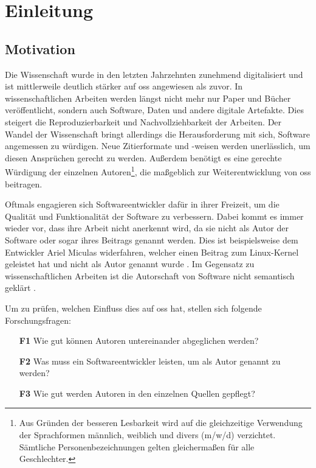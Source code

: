 \chapter{Einleitung}
\label{chap:einleitung}
\section{Motivation}
\label{sec:motivation}
Die Wissenschaft wurde in den letzten Jahrzehnten zunehmend digitalisiert und ist mittlerweile deutlich stärker auf \gls{oss} angewiesen als zuvor.
In wissenschaftlichen Arbeiten werden längst nicht mehr nur Paper und Bücher veröffentlicht, sondern auch Software, Daten und andere digitale Artefakte.
Dies steigert die Reproduzierbarkeit und Nachvollziehbarkeit der Arbeiten.
Der Wandel der Wissenschaft bringt allerdings die Herausforderung mit sich, Software angemessen zu würdigen.
Neue Zitierformate und -weisen werden unerlässlich, um diesen Ansprüchen gerecht zu werden.
Außerdem benötigt es eine gerechte Würdigung der einzelnen Autoren\footnote{Aus Gründen der besseren Lesbarkeit wird auf die gleichzeitige Verwendung der Sprachformen männlich, weiblich und divers (m/w/d) verzichtet. Sämtliche Personenbezeichnungen gelten gleichermaßen für alle Geschlechter.}, die maßgeblich zur Weiterentwicklung von \gls{oss} beitragen.

Oftmals engagieren sich Softwareentwickler dafür in ihrer Freizeit, um die Qualität und Funktionalität der Software zu verbessern.
Dabei kommt es immer wieder vor, dass ihre Arbeit nicht anerkennt wird, da sie nicht als Autor der Software oder sogar ihres Beitrags genannt werden.
Dies ist beispielsweise dem Entwickler Ariel Miculas widerfahren, welcher einen Beitrag zum Linux-Kernel geleistet hat und nicht als Autor genannt wurde \autocite{miculas_how_2023}.
Im Gegensatz zu wissenschaftlichen Arbeiten ist die Autorschaft von Software nicht semantisch geklärt \autocite{schmidt_software_nodate}.

Um zu prüfen, welchen Einfluss dies auf \gls{oss} hat, stellen sich folgende Forschungsfragen:

\begin{itemize}
    \item[\textbf{F1}] Wie gut können Autoren untereinander abgeglichen werden?
    \item[\textbf{F2}] Was muss ein Softwareentwickler leisten, um als Autor genannt zu werden?
    \item[\textbf{F3}] Wie gut werden Autoren in den einzelnen Quellen gepflegt?
\end{itemize}

